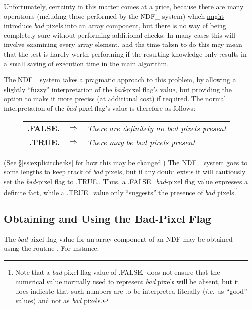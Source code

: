 \documentclass[twoside,11pt,nolof]{starlink}
\providecommand{\st}[1]{{\emph{#1}}}
\begin{document}
Unfortunately, certainty in this matter comes at a price, because there are
many operations (including those performed by the NDF\_ system) which
\underline{might} introduce \st{bad\/} pixels into an array component, but
there is no way of being completely sure without performing additional
checks.
In many cases this will involve examining every array element, and the time
taken to do this may mean that the test is hardly worth performing if the
resulting knowledge only results in a small saving of execution time in the
main algorithm.

The NDF\_ system takes a pragmatic approach to this problem, by allowing a
slightly ``fuzzy'' interpretation of the \st{bad\/}-pixel flag's value, but
providing the option to make it more precise (at additional cost) if
required.
The normal interpretation of the \st{bad\/}-pixel flag's value is therefore
as follows:

\small
\begin{quote}
\begin{center}
\begin{tabular}{rcl}
\textbf{.FALSE.} & $\Rightarrow$ & \st{There are definitely no bad pixels
present}\\
\textbf{.TRUE.} & $\Rightarrow$ & \st{There \underline{may} be bad pixels
present}
\end{tabular}
\end{center}
\end{quote}
\normalsize

(See \S\ref{ss:explicitchecks} for how this may be changed.)
The NDF\_ system goes to some lengths to keep track of \st{bad\/} pixels, but if
any doubt exists it will cautiously set the \st{bad\/}-pixel flag to .TRUE..
Thus, a .FALSE.\ \st{bad\/}-pixel flag value expresses a definite fact, while
a .TRUE.\ value only ``suggests'' the presence of \st{bad\/}
pixels.\footnote{Note that a \st{bad\/}-pixel flag value of .FALSE.\ does not
ensure that the numerical value normally used to represent \st{bad\/} pixels
will be absent, but it does indicate that such numbers are to be interpreted
literally (\st{i.e.}\ as ``good'' values) and not as \st{bad\/} pixels.}

\subsection{\label{ss:usingbadpixflag}Obtaining and Using the Bad-Pixel Flag}

The \st{bad\/}-pixel flag value for an array component of an NDF may be
obtained using the routine .
For instance:
\end{document}
